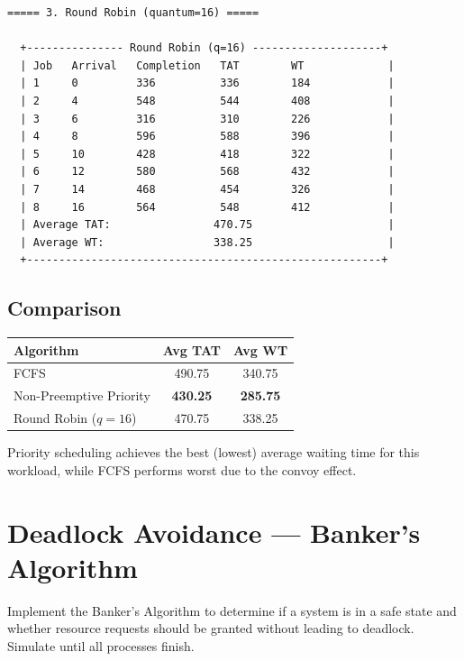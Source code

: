 \documentclass[11pt,a4paper]{article}
\begin{document}
\begin{outputbox}
\begin{lstlisting}[style=outputstyle]
  ===== 3. Round Robin (quantum=16) =====

  +--------------- Round Robin (q=16) --------------------+
  | Job   Arrival   Completion   TAT        WT             |
  | 1     0         336          336        184            |
  | 2     4         548          544        408            |
  | 3     6         316          310        226            |
  | 4     8         596          588        396            |
  | 5     10        428          418        322            |
  | 6     12        580          568        432            |
  | 7     14        468          454        326            |
  | 8     16        564          548        412            |
  | Average TAT:                470.75                     |
  | Average WT:                 338.25                     |
  +-------------------------------------------------------+
\end{lstlisting}
\end{outputbox}

\subsection*{Comparison}
\begin{table}[h]
\centering
\begin{tabular}{lcc}
\toprule
\textbf{Algorithm} & \textbf{Avg TAT} & \textbf{Avg WT} \\
\midrule
FCFS & 490.75 & 340.75 \\
Non-Preemptive Priority & \textbf{430.25} & \textbf{285.75} \\
Round Robin ($q = 16$) & 470.75 & 338.25 \\
\bottomrule
\end{tabular}
\end{table}

Priority scheduling achieves the best (lowest) average waiting time for this workload, while FCFS performs worst due to the convoy effect.

\newpage

\section{Deadlock Avoidance --- Banker's Algorithm}

\begin{questionbox}
Implement the Banker's Algorithm to determine if a system is in a safe state and whether resource requests should be granted without leading to deadlock. Simulate until all processes finish.
\end{questionbox}
\end{document}
